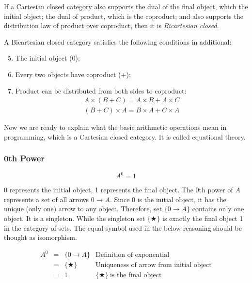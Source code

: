 \documentclass{article}
\begin{document}
If a Cartesian closed category also supports the dual of the final object, which the initial object; the dual of product, which is the coproduct; and also supports the distribution law of product over coproduct, then it is {\em Bicartesian closed}.

A Bicartesian closed category satisfies the following conditions in additional:
\begin{enumerate}
  \setcounter{enumi}{4}
  \item The initial object (0);
  \item Every two objects have coproduct ($+$);
  \item Product can be distributed from both sides to coproduct:
  \[
  \begin{array}{l}
  A \times (B + C) = A \times B + A \times C \\
  (B + C) \times A = B \times A + C \times A
  \end{array}
  \]
\end{enumerate}

 
Now we are ready to explain what the basic arithmetic operations mean in programming, which is a Cartesian closed category. It is called equational theory.

\subsubsection{0th Power}

\[
  A^0 = 1
\]

0 represents the initial object, 1 represents the final object. The 0th power of $A$ represents a set of all arrows $0 \to A$. Since 0 is the initial object, it has the unique (only one) arrow to any object. Therefore, set $\{ 0 \to A \}$ contains only one object. It is a singleton. While the singleton set $\{ \bigstar \}$ is exactly the final object 1 in the category of sets. The equal symbol used in the below reasoning should be thought as isomorphism.

\[
\begin{array}{rcll}
A^0 & = & \{ 0 \to A \} & \text{Definition of exponential} \\
    & = & \{ \bigstar \} & \text{Uniqueness of arrow from initial object} \\
    & = & 1 & \{ \bigstar \}\ \text{is the final object} \\
\end{array}
\]
\end{document}
